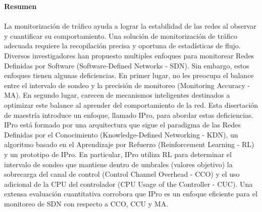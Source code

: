 \textbf{\LARGE Resumen}\\\\
La monitorizaci\'on de tr\'afico ayuda a lograr la estabilidad de las redes al observar y cuantificar su comportamiento. Una soluci\'on de monitorizaci\'on de tr\'afico adecuada requiere la recopilaci\'on precisa y oportuna de estad\'isticas de flujo. Diversos investigadores han propuesto multiples enfoques para monitorear Redes Definidas por Software (Software-Defined Networks - SDN). Sin embargo, estos enfoques tienen algunas deficiencias. En primer lugar, no les preocupa el balance entre el intervalo de sondeo y la precisi\'on de monitoreo (Monitoring Accuracy - MA). En segundo lugar, carecen de mecanismos inteligentes destinados a optimizar este balance al aprender del comportamiento de la red. Esta disertaci\'on de maestr\'ia introduce un enfoque, llamado IPro, para abordar estas deficiencias. IPro est\'a formado por una arquitectura que sigue el paradigma de las Redes Definidas por el Conocimiento (Knowledge-Defined Networking - KDN), un algoritmo basado en el Aprendizaje por Refuerzo (Reinforcement Learning - RL) y un prototipo de IPro. En particular, IPro utiliza RL para determinar el intervalo de sondeo que mantiene dentro de umbrales (valores objetivo) la sobrecarga del canal de control (Control Channel Overhead - CCO) y el uso adicional de la CPU del controlador (CPU Usage of the Controller - CUC). Una extensa evaluaci\'on cuantitativa corrobora que IPro es un enfoque eficiente para el monitoreo de SDN con respecto a CCO, CCU y MA. \\ [2.0cm]

